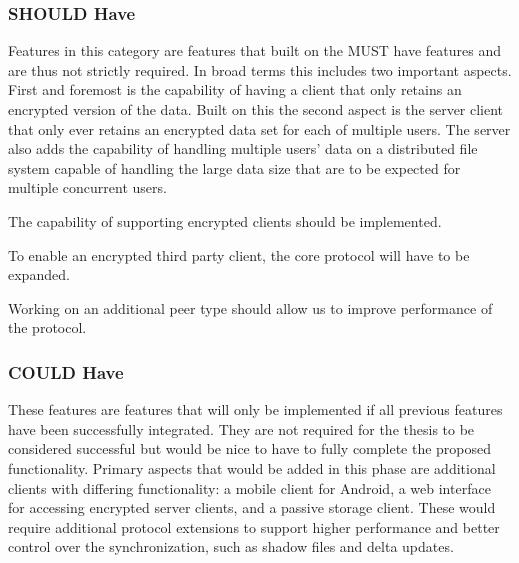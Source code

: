 \subsubsection{SHOULD Have}
\label{subs:SHOULD Have}

Features in this category are features that built on the MUST have features and are thus not strictly required.
In broad terms this includes two important aspects.
First and foremost is the capability of having a client that only retains an encrypted version of the data.
Built on this the second aspect is the server client that only ever retains an encrypted data set for each of multiple users.
The server also adds the capability of handling multiple users' data on a distributed file system capable of handling the large data size that are to be expected for multiple concurrent users.

\begin{description}[leftmargin=10em,style=nextline,noitemsep,nolistsep]
\item[Third Party Client]
    The capability of supporting encrypted clients should be implemented.
\item[Protocol Extension]
    To enable an encrypted third party client, the core protocol will have to be expanded.
\item[Performance]
    Working on an additional peer type should allow us to improve performance of the protocol.
\end{description}

\subsubsection{COULD Have}
\label{subs:COULD Have}

These features are features that will only be implemented if all previous features have been successfully integrated.
They are not required for the thesis to be considered successful but would be nice to have to fully complete the proposed functionality.
Primary aspects that would be added in this phase are additional clients with differing functionality: a mobile client for Android, a web interface for accessing encrypted server clients, and a passive storage client.
These would require additional protocol extensions to support higher performance and better control over the synchronization, such as shadow files and delta updates.

